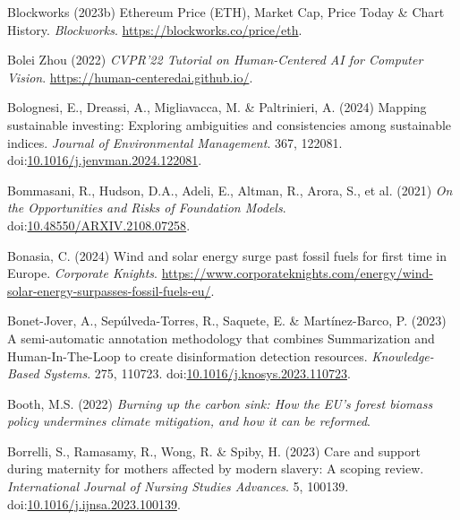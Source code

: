 \documentclass[
  letterpaper,
  DIV=11,
  numbers=noendperiod]{scrartcl}
\newlength{\cslhangindent}
\newenvironment{CSLReferences}[2] %
 {\begin{list}{}{%
  \setlength{\itemindent}{0pt}
  \setlength{\leftmargin}{0pt}
  \setlength{\parsep}{0pt}
  \ifodd #1
   \setlength{\leftmargin}{\cslhangindent}
   \setlength{\itemindent}{-1\cslhangindent}
  \fi
  \setlength{\itemsep}{#2\baselineskip}}}
 {\end{list}}
\begin{document}
\begin{CSLReferences}{0}{1}
Blockworks (2023b) Ethereum {Price} ({ETH}), {Market Cap}, {Price Today}
\& {Chart History}. \emph{Blockworks}.
\url{https://blockworks.co/price/eth}.

Bolei Zhou (2022) \emph{{CVPR}'22 {Tutorial} on {Human-Centered AI} for
{Computer Vision}}. \url{https://human-centeredai.github.io/}.

Bolognesi, E., Dreassi, A., Migliavacca, M. \& Paltrinieri, A. (2024)
Mapping sustainable investing: {Exploring} ambiguities and consistencies
among sustainable indices. \emph{Journal of Environmental Management}.
367, 122081.
doi:\href{https://doi.org/10.1016/j.jenvman.2024.122081}{10.1016/j.jenvman.2024.122081}.

Bommasani, R., Hudson, D.A., Adeli, E., Altman, R., Arora, S., et al.
(2021) \emph{On the {Opportunities} and {Risks} of {Foundation Models}}.
doi:\href{https://doi.org/10.48550/ARXIV.2108.07258}{10.48550/ARXIV.2108.07258}.

Bonasia, C. (2024) Wind and solar energy surge past fossil fuels for
first time in {Europe}. \emph{Corporate Knights}.
\url{https://www.corporateknights.com/energy/wind-solar-energy-surpasses-fossil-fuels-eu/}.

Bonet-Jover, A., Sepúlveda-Torres, R., Saquete, E. \& Martínez-Barco, P.
(2023) A semi-automatic annotation methodology that combines
{Summarization} and {Human-In-The-Loop} to create disinformation
detection resources. \emph{Knowledge-Based Systems}. 275, 110723.
doi:\href{https://doi.org/10.1016/j.knosys.2023.110723}{10.1016/j.knosys.2023.110723}.

Booth, M.S. (2022) \emph{Burning up the carbon sink: {How} the {EU}'s
forest biomass policy undermines climate mitigation, and how it can be
reformed}.

Borrelli, S., Ramasamy, R., Wong, R. \& Spiby, H. (2023) Care and
support during maternity for mothers affected by modern slavery: {A}
scoping review. \emph{International Journal of Nursing Studies
Advances}. 5, 100139.
doi:\href{https://doi.org/10.1016/j.ijnsa.2023.100139}{10.1016/j.ijnsa.2023.100139}.


\end{CSLReferences}
\end{document}
